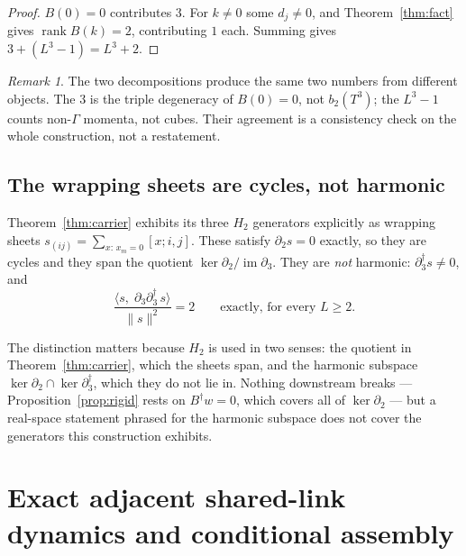 \documentclass[11pt]{article}
\theoremstyle{plain}
\theoremstyle{definition}
\theoremstyle{remark}
\newtheorem{remark}[theorem]{Remark}
\newcommand{\chk}[1]{}
\newcommand{\dg}{^{\dagger}}
\begin{document}
\begin{proof}
$B(0)=0$ contributes $3$. For $k\neq0$ some $d_j\neq0$, and
Theorem~\ref{thm:fact} gives $\operatorname{rank}B(k)=2$, contributing $1$
each. Summing gives $3+(L^3-1)=L^3+2$.
\end{proof}
\chk{the Bloch and chain routes to the carrier agree}

\begin{remark}
The two decompositions produce the same two numbers from different objects.
The $3$ is the triple degeneracy of $B(0)=0$, not $b_2(T^3)$; the $L^3-1$
counts non-$\Gamma$ momenta, not cubes. Their agreement is a consistency check
on the whole construction, not a restatement.
\end{remark}

\subsection{The wrapping sheets are cycles, not harmonic}

Theorem~\ref{thm:carrier} exhibits its three $H_2$ generators explicitly as
wrapping sheets $s_{(ij)}=\sum_{x:\,x_m=0}[x;i,j]$. These satisfy
$\partial_2 s=0$ exactly, so they are cycles and they span the quotient
$\ker\partial_2/\operatorname{im}\partial_3$. They are \emph{not} harmonic:
$\partial_3\dg s\neq0$, and
\begin{equation}
  \frac{\langle s,\;\partial_3\partial_3\dg\,s\rangle}{\|s\|^2}=2
  \qquad\text{exactly, for every }L\ge2 .
\end{equation}
\chk{FINDING: the wrapping sheets are cycles but NOT harmonic}

The distinction matters because $H_2$ is used in two senses: the quotient in
Theorem~\ref{thm:carrier}, which the sheets span, and the harmonic subspace
$\ker\partial_2\cap\ker\partial_3\dg$, which they do not lie in. Nothing
downstream breaks --- Proposition~\ref{prop:rigid} rests on $B\dg w=0$, which
covers all of $\ker\partial_2$ --- but a real-space statement phrased for the
harmonic subspace does not cover the generators this construction exhibits.

\section{Exact adjacent shared-link dynamics and conditional assembly}
\label{sec:second}
\end{document}
